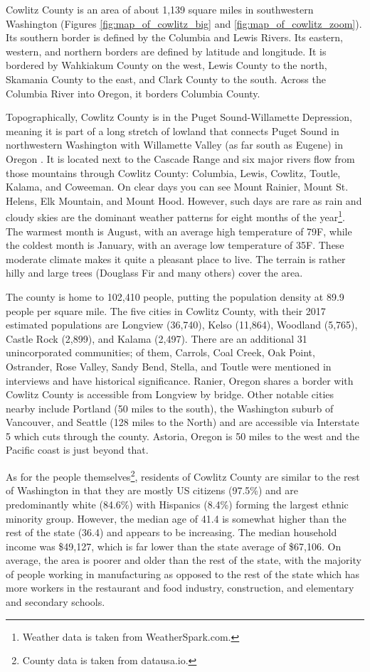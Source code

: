 Cowlitz County is an area of about 1,139 square miles in southwestern Washington (Figures \ref{fig:map_of_cowlitz_big} and \ref{fig:map_of_cowlitz_zoom}). Its southern border is defined by the Columbia and Lewis Rivers. Its eastern, western, and northern borders are defined by latitude and longitude. It is bordered by Wahkiakum County on the west, Lewis County to the north, Skamania County to the east, and Clark County to the south. Across the Columbia River into Oregon, it borders Columbia County.

Topographically, Cowlitz County is in the Puget Sound-Willamette Depression, meaning it is part of a long stretch of lowland that connects Puget Sound in northwestern Washington with Willamette Valley (as far south as Eugene) in Oregon \citep[2]{barrier_froyalde_1998}. It is located next to the Cascade Range and six major rivers flow from those mountains through Cowlitz County: Columbia, Lewis, Cowlitz, Toutle, Kalama, and Coweeman. On clear days you can see Mount Rainier, Mount St. Helens, Elk Mountain, and Mount Hood. However, such days are rare as rain and cloudy skies are the dominant weather patterns for eight months of the year\footnote{Weather data is taken from WeatherSpark.com.}. The warmest month is August, with an average high temperature of 79\degree F, while the coldest month is January, with an average low temperature of 35\degree F. These moderate climate makes it quite a pleasant place to live. The terrain is rather hilly and large trees (Douglass Fir and many others) cover the area.

The county is home to 102,410 people, putting the population density at 89.9 people per square mile. The five cities in Cowlitz County, with their 2017 estimated populations \citep{census_factfinder} are Longview (36,740), Kelso (11,864), Woodland (5,765), Castle Rock (2,899), and Kalama (2,497). There are an additional 31 unincorporated communities; of them, Carrols, Coal Creek, Oak Point, Ostrander, Rose Valley, Sandy Bend, Stella, and Toutle were mentioned in interviews and have historical significance. Ranier, Oregon shares a border with Cowlitz County is accessible from Longview by bridge. Other notable cities nearby include Portland (50 miles to the south), the Washington suburb of Vancouver, and Seattle (128 miles to the North) and are accessible via Interstate 5 which cuts through the county. Astoria, Oregon is 50 miles to the west and the Pacific coast is just beyond that.

As for the people themselves\footnote{County data is taken from datausa.io.}, residents of Cowlitz County are similar to the rest of Washington in that they are mostly US citizens (97.5\%) and are predominantly white (84.6\%) with Hispanics (8.4\%) forming the largest ethnic minority group. However, the median age of 41.4 is somewhat higher than the rest of the state (36.4) and appears to be increasing. The median household income was \$49,127, which is far lower than the state average of \$67,106. On average, the area is poorer and older than the rest of the state, with the majority of people working in manufacturing as opposed to the rest of the state which has more workers in the restaurant and food industry, construction, and elementary and secondary schools.

